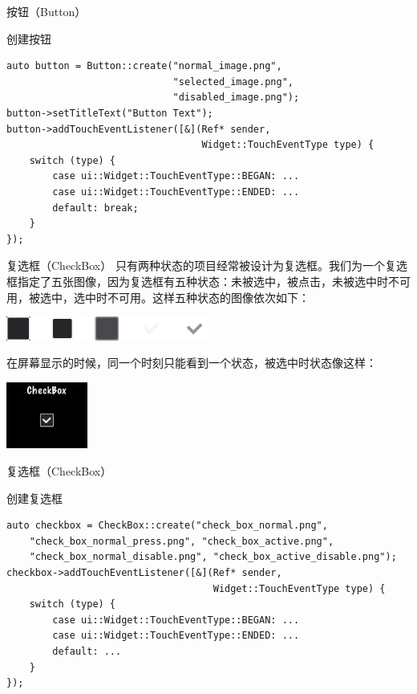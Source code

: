 \documentclass{beamer}
\begin{document}

\begin{frame}[fragile]{按钮（Button）}
\begin{block}{创建按钮}
\begin{verbatim}
auto button = Button::create("normal_image.png",
                             "selected_image.png",
                             "disabled_image.png");
button->setTitleText("Button Text");
button->addTouchEventListener([&](Ref* sender,
                                  Widget::TouchEventType type) {
    switch (type) {
        case ui::Widget::TouchEventType::BEGAN: ...
        case ui::Widget::TouchEventType::ENDED: ...
        default: break;
    }
});
\end{verbatim}
\end{block}
\end{frame}


\begin{frame}[fragile]{复选框（CheckBox）}
只有两种状态的项目经常被设计为复选框。我们为一个复选框指定了五张图像，因为复选框有五种状态：未被选中，被点击，未被选中时不可用，被选中，选中时不可用。这样五种状态的图像依次如下：

\vspace{1em}

\includegraphics[width=0.5\textwidth]
{figures/checkbox_status}

\vspace{1em}

在屏幕显示的时候，同一个时刻只能看到一个状态，被选中时状态像这样：

\vspace{1em}

\includegraphics[width=0.2\textwidth]
{figures/checkbox}
\end{frame}


\begin{frame}[fragile]{复选框（CheckBox）}
\begin{block}{创建复选框}
\begin{verbatim}
auto checkbox = CheckBox::create("check_box_normal.png",
    "check_box_normal_press.png", "check_box_active.png",
    "check_box_normal_disable.png", "check_box_active_disable.png");
checkbox->addTouchEventListener([&](Ref* sender,
                                    Widget::TouchEventType type) {
    switch (type) {
        case ui::Widget::TouchEventType::BEGAN: ...
        case ui::Widget::TouchEventType::ENDED: ...
        default: ...
    }
});
\end{verbatim}
\end{block}
\end{frame}
\end{document}

